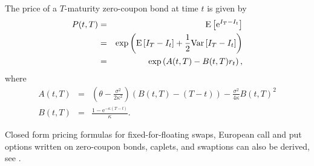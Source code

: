 The price of a $T$-maturity zero-coupon bond at time $t$ is given by
\begin{eqnarray}
P(t,T) &=& \mathrm{E} \left[ \text{e}^{I_T - I_t} \right] \\
&=& \exp \left( \mathrm{E} \left[ I_T - I_t \right] + \frac{1}{2} \mathrm{Var} \left[ I_T - I_t \right] \right) \\
&=& \exp \left( A(t,T) - B(t,T) r_t \right) ,
\end{eqnarray}
where
\begin{eqnarray}
A(t,T) &=& \left( \theta - \frac{\sigma^2}{2 \kappa^2} \right) \left( B(t,T) - (T- t)\right) - \frac{\sigma^2}{4 \kappa} B(t,T)^2 \\
B(t,T) &=& \frac{1 - \text{e}^{-\kappa (T-t)}}{\kappa}.
\end{eqnarray}

Closed form pricing formulas for fixed-for-floating swaps, European call and put options written on zero-coupon bonds, caplets, and swaptions can also be derived, see \cite{Brigo2007, Andersen2010}.